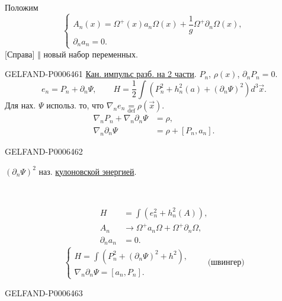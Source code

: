 Положим
\[
\begin{cases}
A_n(x)=\Omega^+(x)a_n\Omega(x)+\dfrac1g\Omega^+\partial_n\Omega(x),\\
\partial_n a_n=0.
\end{cases}
\]
[Справа] \(\Vert\) новый набор переменных.


\begin{GelfandAdjacentEvidence}{GELFAND-P000646}{1}
\underline{Кан. импульс разб. на 2 части}.
\(P_n\), \(\rho(x)\), \(\partial_nP_n=0\).
\[
e_n=P_n+\partial_n\Psi,\qquad
H=\frac12\int(P_n^2+h_n^2(a)+(\partial_n\Psi)^2)d^3\vec x.
\]
Для нах. \(\Psi\) использ. то, что \(\nabla_n e_n\underset{\mathrm{def}}{=}\rho(\vec x)\).
\[
\begin{aligned}
\nabla_nP_n+\nabla_n\partial_n\Psi&=\rho,\\
\nabla_n\partial_n\Psi&=\rho+[P_n,a_n].
\end{aligned}
\]
\end{GelfandAdjacentEvidence}
\begin{GelfandAdjacentEvidence}{GELFAND-P000646}{2}

\((\partial_n\Psi)^2\) наз. \underline{кулоновской энергией}.

\begin{center}\textemdash\,\textperiodcentered\,\textemdash\end{center}

\[
\begin{aligned}
H&=\int(e_n^2+h_n^2(A)),\\
A_n&\longrightarrow\Omega^+a_n\Omega+\Omega^+\partial_n\Omega,\\
\partial_n a_n&=0.
\end{aligned}
\]
\[
\begin{cases}
H=\int(P_n^2+(\partial_n\Psi)^2+h^2),\\
\nabla_n\partial_n\Psi=[a_n,P_n].
\end{cases}
\qquad\text{(швингер)}
\]
\end{GelfandAdjacentEvidence}
\begin{GelfandAdjacentEvidence}{GELFAND-P000646}{3}

\end{GelfandAdjacentEvidence}
